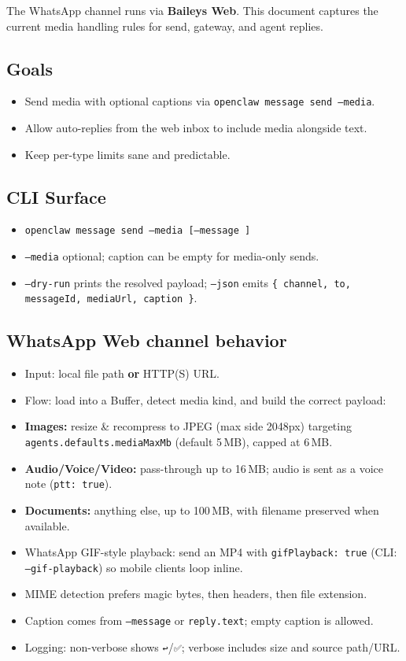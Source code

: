The WhatsApp channel runs via \textbf{Baileys Web}. This document captures the current media handling rules for send, gateway, and agent replies.

\subsection{Goals}


\begin{itemize}
  \item Send media with optional captions via \texttt{openclaw message send --media}.
  \item Allow auto-replies from the web inbox to include media alongside text.
  \item Keep per-type limits sane and predictable.
\end{itemize}


\subsection{CLI Surface}


\begin{itemize}
  \item \texttt{openclaw message send --media  [--message ]}
  \item \texttt{--media} optional; caption can be empty for media-only sends.
  \item \texttt{--dry-run} prints the resolved payload; \texttt{--json} emits \texttt{\{ channel, to, messageId, mediaUrl, caption \}}.
\end{itemize}


\subsection{WhatsApp Web channel behavior}


\begin{itemize}
  \item Input: local file path \textbf{or} HTTP(S) URL.
  \item Flow: load into a Buffer, detect media kind, and build the correct payload:
  \item \textbf{Images:} resize \& recompress to JPEG (max side 2048px) targeting \texttt{agents.defaults.mediaMaxMb} (default 5 MB), capped at 6 MB.
  \item \textbf{Audio/Voice/Video:} pass-through up to 16 MB; audio is sent as a voice note (\texttt{ptt: true}).
  \item \textbf{Documents:} anything else, up to 100 MB, with filename preserved when available.
  \item WhatsApp GIF-style playback: send an MP4 with \texttt{gifPlayback: true} (CLI: \texttt{--gif-playback}) so mobile clients loop inline.
  \item MIME detection prefers magic bytes, then headers, then file extension.
  \item Caption comes from \texttt{--message} or \texttt{reply.text}; empty caption is allowed.
  \item Logging: non-verbose shows \texttt{↩️}/\texttt{✅}; verbose includes size and source path/URL.
\end{itemize}


